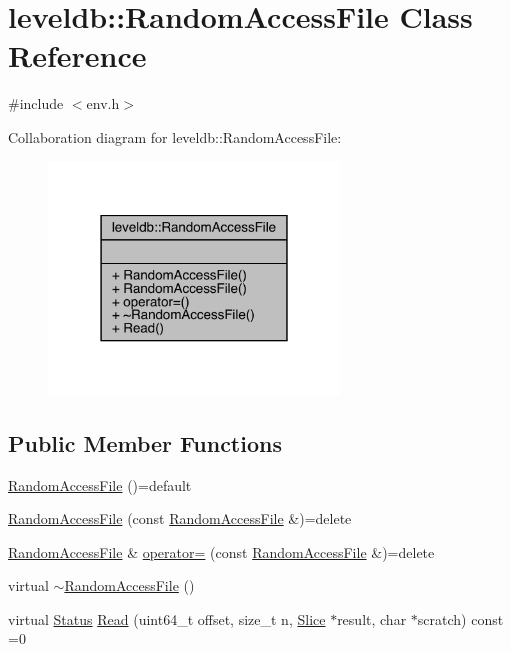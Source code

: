 \hypertarget{classleveldb_1_1_random_access_file}{}\section{leveldb\+::Random\+Access\+File Class Reference}
\label{classleveldb_1_1_random_access_file}


{\ttfamily \#include $<$env.\+h$>$}



Collaboration diagram for leveldb\+::Random\+Access\+File\+:
\nopagebreak
\begin{figure}[H]
\begin{center}
\leavevmode
\includegraphics[width=219pt]{classleveldb_1_1_random_access_file__coll__graph}
\end{center}
\end{figure}
\subsection*{Public Member Functions}
\begin{DoxyCompactItemize}
\item 
\mbox{\hyperlink{classleveldb_1_1_random_access_file_ac1201ada4756ffa48d6673de1e08e314}{Random\+Access\+File}} ()=default
\item 
\mbox{\hyperlink{classleveldb_1_1_random_access_file_a2f1cd32497cb5c1c468b879cd74be749}{Random\+Access\+File}} (const \mbox{\hyperlink{classleveldb_1_1_random_access_file}{Random\+Access\+File}} \&)=delete
\item 
\mbox{\hyperlink{classleveldb_1_1_random_access_file}{Random\+Access\+File}} \& \mbox{\hyperlink{classleveldb_1_1_random_access_file_ad76fdf4e12b84592a7ac31a3b57a7377}{operator=}} (const \mbox{\hyperlink{classleveldb_1_1_random_access_file}{Random\+Access\+File}} \&)=delete
\item 
virtual \mbox{\hyperlink{classleveldb_1_1_random_access_file_aed7e781942392270a8c274802f2e62e5}{$\sim$\+Random\+Access\+File}} ()
\item 
virtual \mbox{\hyperlink{classleveldb_1_1_status}{Status}} \mbox{\hyperlink{classleveldb_1_1_random_access_file_a1a09fadcec904d9791a968acabca98d0}{Read}} (uint64\+\_\+t offset, size\+\_\+t n, \mbox{\hyperlink{classleveldb_1_1_slice}{Slice}} $\ast$result, char $\ast$scratch) const =0
\end{DoxyCompactItemize}


